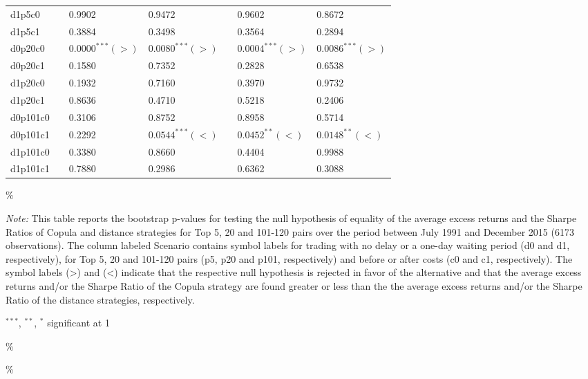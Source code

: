 \documentclass[a4paper]{article}
\begin{document}
\begin{threeparttable}[H]
\begin{tabularx}{\textwidth}{@{\extracolsep{\fill}}lllllll@{}}
			d1p5c0 & & 0.9902 & 0.9472 &       & 0.9602 & 0.8672 \\
			d1p5c1 & & 0.3884 & 0.3498 &       & 0.3564 & 0.2894 \\
			d0p20c0 & & $0.0000^{***}(>)$ & $0.0080^{***}(>)$ &       & $0.0004^{***}(>)$ & $0.0086^{***}(>)$ \\
			d0p20c1 & & 0.1580 & 0.7352 &       & 0.2828 & 0.6538 \\
			d1p20c0 & & 0.1932 & 0.7160 &       & 0.3970 & 0.9732 \\
			d1p20c1 & & 0.8636 & 0.4710 &       & 0.5218 & 0.2406 \\
			d0p101c0 & & 0.3106 & 0.8752 &       & 0.8958 & 0.5714 \\
			d0p101c1 & & 0.2292 & $0.0544^{***}(<)$ &       & $0.0452^{**}(<)$ & $0.0148^{**}(<)$ \\
			d1p101c0 & & 0.3380 & 0.8660 &       & 0.4404 & 0.9988 \\
			d1p101c1 & & 0.7880 & 0.2986 &       & 0.6362 & 0.3088 \\
			\bottomrule
		\end{tabularx}\%
		\begin{tablenotes}
			\item \textit{Note:} \scriptsize This table reports the bootstrap p-values for testing the null hypothesis of equality of the average excess returns and the Sharpe Ratios of Copula and distance strategies for Top 5, 20 and 101-120 pairs over the period between July 1991 and December 2015 (6173 observations). The column labeled Scenario contains symbol labels for trading with no delay or a one-day waiting period (d0 and d1, respectively), for Top 5, 20 and 101-120 pairs (p5, p20 and p101, respectively) and before or after costs (c0 and c1, respectively). The symbol labels (>) and (<) indicate that the respective null hypothesis is rejected in favor of the alternative and that the average excess returns and/or the Sharpe Ratio of the Copula strategy are found greater or less than the the average excess returns and/or the Sharpe Ratio of the distance strategies, respectively.
			\item \scriptsize $^{\ast\ast\ast}$, $^{\ast\ast}$, $^{\ast}$  significant at 1\\%
		\end{tablenotes}
		\label{tab:table120}\%
	\end{threeparttable}\%
	
\end{document}
